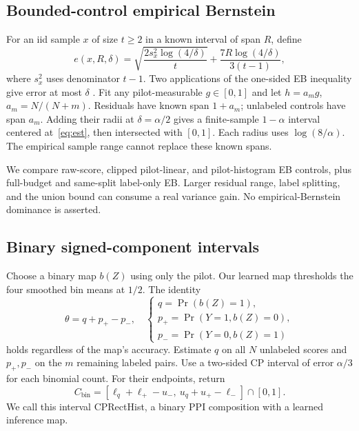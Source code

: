 \documentclass{article}
\begin{document}
\subsection{Bounded-control empirical Bernstein}
For an iid sample $x$ of size $t\ge2$ in a known interval of span $R$, define
\begin{equation}
 e(x,R,\delta)=\sqrt{\frac{2s_x^2\log(4/\delta)}t}
 +\frac{7R\log(4/\delta)}{3(t-1)},
 \label{eq:eb}
\end{equation}
where $s_x^2$ uses denominator $t-1$. Two applications of the one-sided EB inequality give error at most $\delta$ \citep{maurer2009}. Fit any pilot-measurable $g\in[0,1]$ and let $h=a_mg$, $a_m=N/(N+m)$. Residuals have known span $1+a_m$; unlabeled controls have span $a_m$. Adding their radii at $\delta=\alpha/2$ gives a finite-sample $1-\alpha$ interval centered at~\eqref{eq:est}, then intersected with $[0,1]$. Each radius uses $\log(8/\alpha)$. The empirical sample range cannot replace these known spans.

We compare raw-score, clipped pilot-linear, and pilot-histogram EB controls, plus full-budget and same-split label-only EB. Larger residual range, label splitting, and the union bound can consume a real variance gain. No empirical-Bernstein dominance is asserted.

\subsection{Binary signed-component intervals}
Choose a binary map $b(Z)$ using only the pilot. Our learned map thresholds the four smoothed bin means at $1/2$. The identity
\begin{equation}
 \theta=q+p_+-p_-,\quad
 \begin{cases}
 q=\Pr(b(Z)=1),\\
 p_+=\Pr(Y=1,b(Z)=0),\\
 p_-=\Pr(Y=0,b(Z)=1)
 \end{cases}
 \label{eq:binary}
\end{equation}
holds regardless of the map's accuracy. Estimate $q$ on all $N$ unlabeled scores and $p_+,p_-$ on the $m$ remaining labeled pairs. Use a two-sided CP interval of error $\alpha/3$ for each binomial count. For their endpoints, return
\begin{equation}
 C_{\mathrm{bin}}=[\ell_q+\ell_+-u_-,\ u_q+u_+-\ell_-]\cap[0,1].
 \label{eq:compose}
\end{equation}
We call this interval CPRectHist, a binary PPI composition with a learned inference map.
\end{document}
